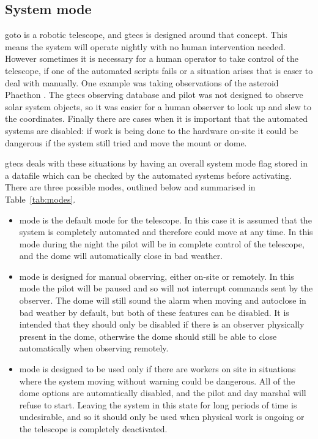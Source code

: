 \begin{colsection}
\begin{colsection}
\end{colsection}


\subsection{System mode}
\label{sec:mode}
\begin{colsection}

\gls{goto} is a robotic telescope, and \gls{gtecs} is designed around that concept. This means the system will operate nightly with no human intervention needed. However sometimes it is necessary for a human operator to take control of the telescope, if one of the automated scripts fails or a situation arises that is easer to deal with manually. One example was taking observations of the asteroid Phaethon \citep{Phaethon}. The \gls{gtecs} observing database and pilot was not designed to observe solar system objects, so it was easier for a human observer to look up and slew to the coordinates. Finally there are cases when it is important that the automated systems are disabled: if work is being done to the hardware on-site it could be dangerous if the system still tried and move the mount or dome.

\gls{gtecs} deals with these situations by having an overall system mode flag stored in a datafile which can be checked by the automated systems before activating. There are three possible modes, outlined below and summarised in Table~\ref{tab:modes}.

\begin{itemize}
    \item {} mode is the default mode for the telescope. In this case it is assumed that the system is completely automated and therefore could move at any time. In this mode during the night the pilot will be in complete control of the telescope, and the dome will automatically close in bad weather.
    \item {} mode is designed for manual observing, either on-site or remotely. In this mode the pilot will be paused and so will not interrupt commands sent by the observer. The dome will still sound the alarm when moving and autoclose in bad weather by default, but both of these features can be disabled. It is intended that they should only be disabled if there is an observer physically present in the dome, otherwise the dome should still be able to close automatically when observing remotely.
    \item {} mode is designed to be used only if there are workers on site in situations where the system moving without warning could be dangerous. All of the dome options are automatically disabled, and the pilot and day marshal will refuse to start. Leaving the system in this state for long periods of time is undesirable, and so it should only be used when physical work is ongoing or the telescope is completely deactivated.
\end{itemize}


\end{colsection}
\end{colsection}
